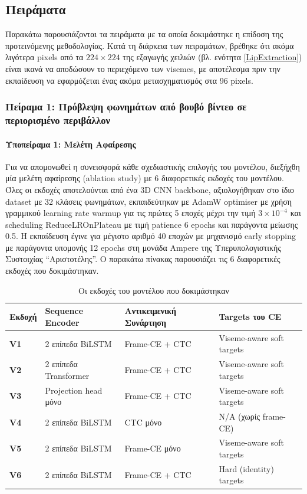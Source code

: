 \subsection{Πειράματα}

Παρακάτω παρουσιάζονται τα πειράματα με τα οποία δοκιμάστηκε η επίδοση της προτεινόμενης μεθοδολογίας. Κατά τη διάρκεια των πειραμάτων, βρέθηκε ότι ακόμα λιγότερα pixels από τα $224 \times 224$ της εξαγωγής χειλιών (βλ. ενότητα \ref{LipExtraction}) είναι ικανά να αποδώσουν το περιεχόμενο των visemes, με αποτέλεσμα πριν την εκπαίδευση να εφαρμόζεται ένας ακόμα μετασχηματισμός στα 96 pixels.

\subsubsection{Πείραμα 1: Πρόβλεψη φωνημάτων από βουβό βίντεο σε περιορισμένο περιβάλλον}
\label{Experiment1}

\paragraph{Υποπείραμα 1: Μελέτη Αφαίρεσης}

Για να απομονωθεί η συνεισφορά κάθε σχεδιαστικής επιλογής του μοντέλου, διεξήχθη μία μελέτη αφαίρεσης (ablation study) με 6 διαφορετικές εκδοχές του μοντέλου. Όλες οι εκδοχές αποτελούνται από ένα 3D CNN backbone, αξιολογήθηκαν στο ίδιο dataset με 32 κλάσεις φωνημάτων, εκπαιδεύτηκαν με AdamW optimiser με χρήση γραμμικού learning rate warmup για τις πρώτες 5 εποχές μέχρι την τιμή $3\times10^{-4}$ και scheduling ReduceLROnPlateau με τιμή patience 6 epochs και παράγοντα μείωσης 0.5. Η εκπαίδευση έγινε για μέγιστο αριθμό 40 εποχών με μηχανισμό early stopping με παράγοντα υπομονής 12 epochs στη μονάδα Ampere της Υπερυπολογιστικής Συστοιχίας ``Αριστοτέλης''. Ο παρακάτω πίνακας παρουσιάζει τις 6 διαφορετικές εκδοχές που δοκιμάστηκαν.

\begin{table}[htbp]
\centering
\caption{Οι εκδοχές του μοντέλου που δοκιμάστηκαν}
\label{tab:variants_summary}
\vspace{2mm}
\small
\begin{tabular}{|l|l|l|l|}
\hline
\textbf{Εκδοχή} & \textbf{Sequence Encoder} & \textbf{Αντικειμενική Συνάρτηση} & \textbf{Targets του CE} \\ \hline
\textbf{V1} & 2 επίπεδα BiLSTM & Frame-CE + CTC & Viseme-aware soft targets \\ \hline
\textbf{V2} & 2 επίπεδα Transformer & Frame-CE + CTC & Viseme-aware soft targets \\ \hline
\textbf{V3} & Projection head μόνο & Frame-CE + CTC & Viseme-aware soft targets \\ \hline
\textbf{V4} & 2 επίπεδα BiLSTM & CTC μόνο & N/A (χωρίς frame-CE) \\ \hline
\textbf{V5} & 2 επίπεδα BiLSTM & Frame-CE μόνο & Viseme-aware soft targets \\ \hline
\textbf{V6} & 2 επίπεδα BiLSTM & Frame-CE + CTC & Hard (identity) targets \\ \hline
\end{tabular}
\end{table}

